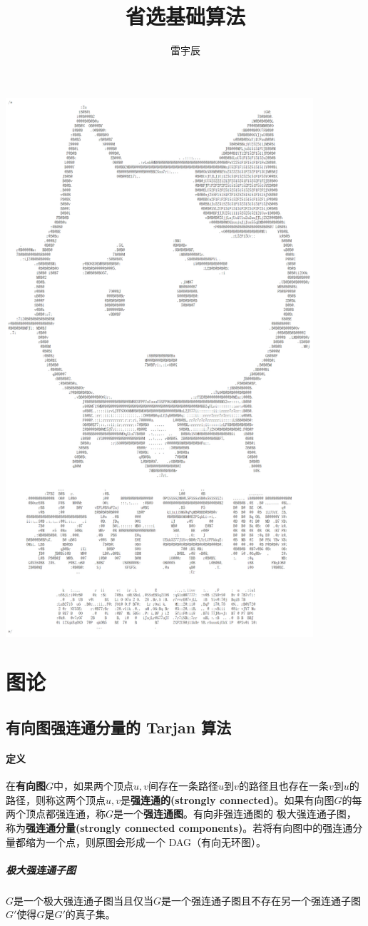 \documentclass[]{cpp}
\title{省选基础算法}
\author{雷宇辰}
\begin{document}
\setcounter{page}{0}
\maketitle
\begin{center}\includegraphics[height=20cm]{assets/banner.png}\end{center}
\newpage
\tableofcontents
\newpage
\setcounter{page}{1}
\section{图论}
\subsection{有向图强连通分量的 Tarjan 算法}
\paragraph{定义}
	在\textbf{有向图$G$}中，如果两个顶点$u,v$间存在一条路径$u$到$v$的路径且也存在一条$v$到$u$的路径，则称这两个顶点$u,v$是\textbf{强连通的(strongly connected)}。如果有向图$G$的每两个顶点都强连通，称$G$是一个\textbf{强连通图}。有向非强连通图的 极大强连通子图，称为\textbf{强连通分量(strongly connected components)}。若将有向图中的强连通分量都缩为一个点，则原图会形成一个 DAG（有向无环图）。
\subparagraph{极大强连通子图}
	$G$是一个极大强连通子图当且仅当$G$是一个强连通子图且不存在另一个强连通子图$G'$使得$G$是$G'$的真子集。
\end{document}
